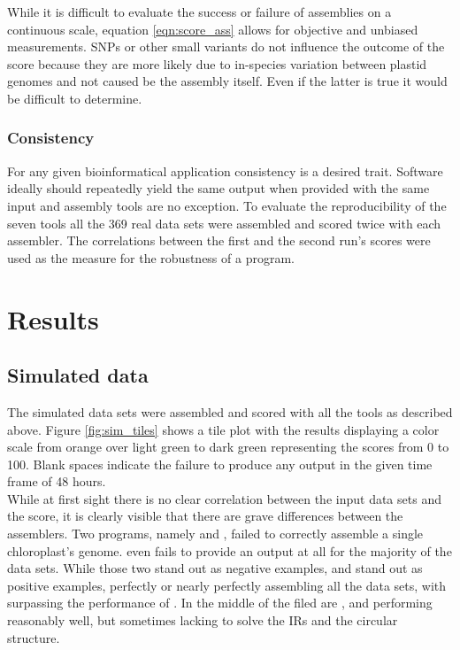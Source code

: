 While it is difficult to evaluate the success or failure of assemblies on a continuous
scale, equation \ref{eqn:score_ass} allows for objective and unbiased measurements. SNPs
or other small variants do not influence the outcome of the score because they are more
likely due to in-species variation between plastid genomes and not caused be the assembly
itself. Even if the latter is true it would be difficult to determine.
  
\subsubsection{Consistency}
For any given bioinformatical application consistency is a desired trait. Software ideally
should repeatedly yield the same output when provided with the same input and assembly
tools are no exception. To evaluate the reproducibility of the seven tools all the 369
real data sets were assembled and scored twice with each assembler. The correlations
between the first and the second run's scores were used as the measure for the robustness
of a program.

\section{Results} \label{results:ca}
\subsection{Simulated data}
\label{results:sim}

The simulated data sets were assembled and scored with all the tools as described
above. Figure \ref{fig:sim_tiles} shows a tile plot with the results displaying a color
scale from orange over light
green to dark green representing the scores from 0 to 100. Blank spaces indicate the failure to produce any output in the given time frame of 48 hours. \\
While at first sight there is no clear correlation between the input data sets and the
score, it is clearly visible that there are grave differences between the assemblers. Two
programs, namely \cassp \hspace{0.25ex} and \ioga, failed to correctly assemble a single
chloroplast's genome. \ioga \hspace{0.25ex} even fails to provide an output at all for the
majority of the data sets. While those two stand out as negative examples, \fp
\hspace{0.25ex} and \go \hspace{0.25ex} stand out as positive examples, perfectly or nearly
perfectly assembling all the data sets, with \go \hspace{0.25ex} surpassing the performance
of \fp. In the middle of the filed are \ce, \oa \hspace{0.25ex} and \np \hspace{0.25ex}
performing reasonably well, but sometimes lacking to solve the IRs and the circular
structure.

